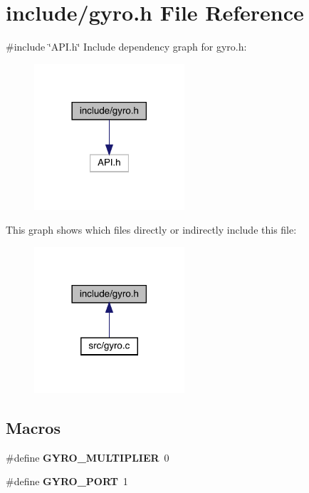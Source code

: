 \section{include/gyro.h File Reference}
\label{gyro_8h}
{\ttfamily \#include \char`\"{}A\+P\+I.\+h\char`\"{}}\newline
Include dependency graph for gyro.\+h\+:
\nopagebreak
\begin{figure}[H]
\begin{center}
\leavevmode
\includegraphics[width=158pt]{gyro_8h__incl}
\end{center}
\end{figure}
This graph shows which files directly or indirectly include this file\+:
\nopagebreak
\begin{figure}[H]
\begin{center}
\leavevmode
\includegraphics[width=158pt]{gyro_8h__dep__incl}
\end{center}
\end{figure}
\subsection*{Macros}
\begin{DoxyCompactItemize}
\item 
\#define \textbf{ G\+Y\+R\+O\+\_\+\+M\+U\+L\+T\+I\+P\+L\+I\+ER}~0
\item 
\#define \textbf{ G\+Y\+R\+O\+\_\+\+P\+O\+RT}~1
\end{DoxyCompactItemize}
